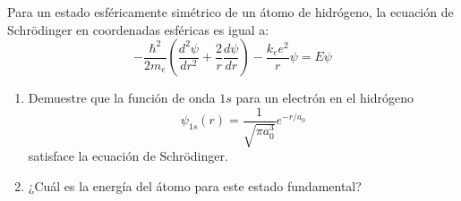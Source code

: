 \item Para un estado esféricamente simétrico de un átomo de hidrógeno, la ecuación de Schrödinger en coordenadas esféricas es igual a:
$$ -\frac{\hbar^2}{2m_e} \left( \frac{d^2\psi}{dr^2} + \frac{2}{r} \frac{d\psi}{dr} \right) - \frac{k_e e^2}{r} \psi = E\psi $$
\begin{enumerate}
    \item Demuestre que la función de onda $1s$ para un electrón en el hidrógeno
    $$ \psi_{1s}(r) = \frac{1}{\sqrt{\pi a_0^3}} e^{-r/a_0} $$
    satisface la ecuación de Schrödinger.
    \item ¿Cuál es la energía del átomo para este estado fundamental?
\end{enumerate}